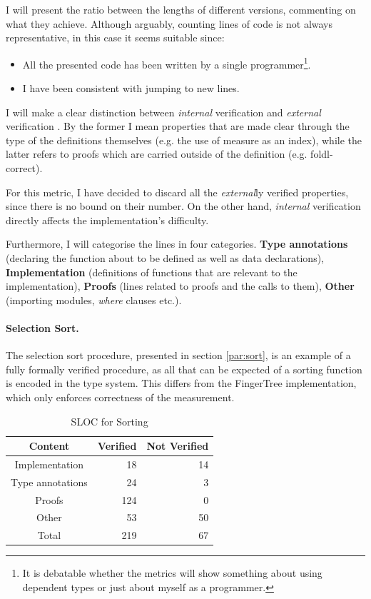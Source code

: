 \documentclass[12pt,twoside,notitlepage]{report}
\begin{document}
I will present the ratio between the lengths of different versions, commenting on what they achieve. Although arguably, counting lines of code is not always representative, in this case it seems suitable since: 
\begin{itemize}
\item All the presented code has been written by a single programmer\footnote{It is debatable whether the metrics will show something about using dependent types or just about myself as a programmer.}.
\item I have been consistent with jumping to new lines.
\end{itemize}
	
I will make a clear distinction between \textit{internal} verification and \textit{external} verification \cite{verifagda}. By the former I mean properties that are made clear through the type of the definitions themselves (e.g. the use of measure as an index), while the latter refers to proofs which are carried outside of the definition (e.g. foldl-correct).

For this metric, I have decided to discard all the \textit{external}ly verified properties, since there is no bound on their number. On the other hand, \textit{internal} verification directly affects the implementation's difficulty.

Furthermore, I will categorise the lines in four categories. \textbf{Type annotations} (declaring the function about to be defined as well as data declarations), \textbf{Implementation} (definitions of functions that are relevant to the implementation), \textbf{Proofs} (lines related to proofs and the calls to them), \textbf{Other} (importing modules, \textit{where} clauses etc.).
  
\paragraph{Selection Sort.}

The selection sort procedure, presented in section \ref{par:sort}, is an example of a fully formally verified procedure, as all that can be expected of a sorting function is encoded in the type system. This differs from the FingerTree implementation, which only enforces correctness of the measurement.

\begin{table}[H]
\caption{SLOC for Sorting}
\center
\begin{tabular}{c r r}
\hline
Content & Verified & Not Verified\\
\hline
Implementation & 18 & 14 \\
Type annotations & 24 & 3 \\
Proofs & 124 & 0 \\
Other & 53 & 50 \\
Total & 219 & 67 \\
\hline
\end{tabular} 
\end{table}
\end{document}
